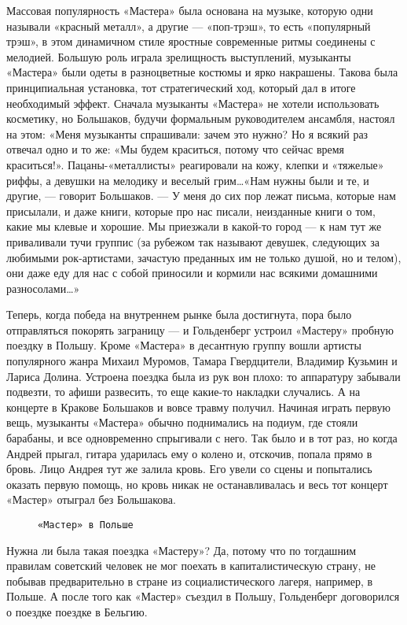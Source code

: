 Массовая популярность «Мастера» была основана на музыке, которую одни называли «красный металл», а другие — «поп-трэш»,
то есть «популярный трэш», в этом динамичном стиле яростные современные ритмы соединены с мелодией. Большую роль играла
зрелищность выступлений, музыканты «Мастера» были одеты в разноцветные костюмы и ярко накрашены. Такова была
принципиальная установка, тот стратегический ход, который дал в итоге необходимый эффект. Сначала музыканты «Мастера» не
хотели использовать косметику, но Большаков, будучи формальным руководителем ансамбля, настоял на этом: «Меня музыканты
спрашивали: зачем это нужно? Но я всякий раз отвечал одно и то же: «Мы будем краситься, потому что сейчас время
краситься!». Пацаны-«металлисты» реагировали на кожу, клепки и «тяжелые» риффы, а девушки на мелодику и веселый
грим\ldots «Нам нужны были и те, и другие, — говорит Большаков. — У меня до сих пор лежат письма, которые нам присылали,
и даже книги, которые про нас писали, неизданные книги о том, какие мы клевые и хорошие. Мы приезжали в какой-то город —
к нам тут же приваливали тучи группис (за рубежом так называют девушек, следующих за любимыми рок-артистами, зачастую
преданных им не только душой, но и телом), они даже еду для нас с собой приносили и кормили нас всякими домашними
разносолами\ldots»

Теперь, когда победа на внутреннем рынке была достигнута, пора было отправляться покорять заграницу — и Гольденберг
устроил «Мастеру» пробную поездку в Польшу. Кроме «Мастера» в десантную группу вошли артисты популярного жанра Михаил
Муромов, Тамара Гвердцители, Владимир Кузьмин и Лариса Долина. Устроена поездка была из рук вон плохо: то аппаратуру
забывали подвезти, то афиши развесить, то еще какие-то накладки случались. А на концерте в Кракове Большаков и вовсе
травму получил. Начиная играть первую вещь, музыканты «Мастера» обычно поднимались на подиум, где стояли барабаны, и все
одновременно спрыгивали с него. Так было и в тот раз, но когда Андрей прыгал, гитара ударилась ему о колено и, отскочив,
попала прямо в бровь. Лицо Андрея тут же залила кровь. Его увели со сцены и попытались оказать первую помощь, но кровь
никак не останавливалась и весь тот концерт «Мастер» отыграл без Большакова.

\begin{figure}[h]
    \centering
    \caption{\texttt{«Мастер» в Польше}}
\end{figure}

Нужна ли была такая поездка «Мастеру»? Да, потому что по тогдашним правилам советский человек не мог поехать в
капиталистическую страну, не побывав предварительно в стране из социалистического лагеря, например, в Польше. А после
того как «Мастер» съездил в Польшу, Гольденберг договорился о поездке поездке в Бельгию.

